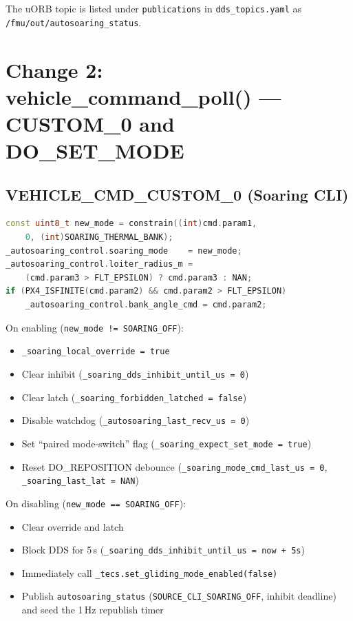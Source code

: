 \documentclass[12pt,a4paper]{article}
\begin{document}
The uORB topic is listed under \texttt{publications} in
\texttt{dds\_topics.yaml} as \texttt{/fmu/out/autosoaring\_status}.

\section{Change 2: vehicle\_command\_poll() --- CUSTOM\_0 and DO\_SET\_MODE}

\subsection{VEHICLE\_CMD\_CUSTOM\_0 (Soaring CLI)}

\begin{lstlisting}[language=C++]
const uint8_t new_mode = constrain((int)cmd.param1,
    0, (int)SOARING_THERMAL_BANK);
_autosoaring_control.soaring_mode    = new_mode;
_autosoaring_control.loiter_radius_m =
    (cmd.param3 > FLT_EPSILON) ? cmd.param3 : NAN;
if (PX4_ISFINITE(cmd.param2) && cmd.param2 > FLT_EPSILON)
    _autosoaring_control.bank_angle_cmd = cmd.param2;
\end{lstlisting}

On enabling (\texttt{new\_mode != SOARING\_OFF}):
\begin{itemize}
  \item \texttt{\_soaring\_local\_override = true}
  \item Clear inhibit (\texttt{\_soaring\_dds\_inhibit\_until\_us = 0})
  \item Clear latch (\texttt{\_soaring\_forbidden\_latched = false})
  \item Disable watchdog (\texttt{\_autosoaring\_last\_recv\_us = 0})
  \item Set ``paired mode-switch'' flag (\texttt{\_soaring\_expect\_set\_mode = true})
  \item Reset DO\_REPOSITION debounce (\texttt{\_soaring\_mode\_cmd\_last\_us = 0},
        \texttt{\_soaring\_last\_lat = NAN})
\end{itemize}

On disabling (\texttt{new\_mode == SOARING\_OFF}):
\begin{itemize}
  \item Clear override and latch
  \item Block DDS for 5\,s (\texttt{\_soaring\_dds\_inhibit\_until\_us = now + 5s})
  \item Immediately call \texttt{\_tecs.set\_gliding\_mode\_enabled(false)}
  \item Publish \texttt{autosoaring\_status} (\texttt{SOURCE\_CLI\_SOARING\_OFF},
        inhibit deadline) and seed the 1\,Hz republish timer
\end{itemize}
\end{document}
